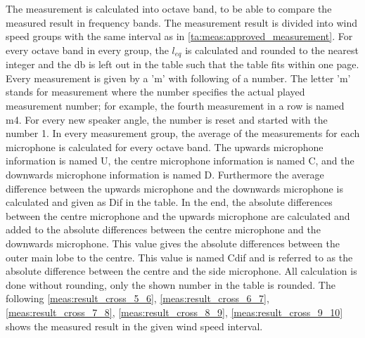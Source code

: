 The measurement is calculated into octave band, to be able to compare the measured result in frequency bands. The measurement result is divided into wind speed groups with the same interval as in \autoref{ta:meas:approved_measurement}. For every octave band in every group, the $l_{eq}$ is calculated and rounded to the nearest integer and the \si{\decibel} is left out in the table such that the table fits within one page. Every measurement is given by a 'm' with following of a number. The letter 'm' stands for measurement where the number specifies the actual played measurement number; for example, the fourth measurement in a row is named m4. For every new speaker angle, the number is reset and started with the number 1. In every measurement group, the average of the measurements for each microphone is calculated for every octave band. The upwards microphone information is named U, the centre microphone information is named C, and the downwards microphone information is named D. Furthermore the average difference between the upwards microphone and the downwards microphone is calculated and given as Dif in the table. In the end, the absolute differences between the centre microphone and the upwards microphone are calculated and added to the absolute differences between the centre microphone and the downwards microphone. This value gives the absolute differences between the outer main lobe to the centre. This value is named Cdif and is referred to as the absolute difference between the centre and the side microphone. All calculation is done without rounding, only the shown number in the table is rounded. The following \autoref{meas:result_cross_5_6}, \autoref{meas:result_cross_6_7}, \autoref{meas:result_cross_7_8}, \autoref{meas:result_cross_8_9}, \autoref{meas:result_cross_9_10} shows the measured result in the given wind speed interval.







